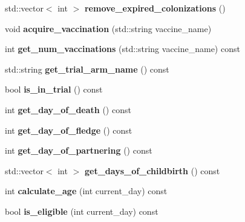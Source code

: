 \begin{DoxyCompactItemize}
\mbox{\label{class_host_a1c83f73e43316586407e721208d5e704}} 
std\+::vector$<$ int $>$ {\bfseries remove\+\_\+expired\+\_\+colonizations} ()
\item 
\mbox{\label{class_host_a69d098ceeaac81c3b6545b8f2ba189b5}} 
void {\bfseries acquire\+\_\+vaccination} (std\+::string vaccine\+\_\+name)
\item 
\mbox{\label{class_host_a2b04ced718b86ae04af2097fbf369360}} 
int {\bfseries get\+\_\+num\+\_\+vaccinations} (std\+::string vaccine\+\_\+name) const
\item 
\mbox{\label{class_host_aa2db492a08b642254b80ecc590b15dc3}} 
std\+::string {\bfseries get\+\_\+trial\+\_\+arm\+\_\+name} () const
\item 
\mbox{\label{class_host_aad27a8ad2d8129fb19830cb2efc03a3d}} 
bool {\bfseries is\+\_\+in\+\_\+trial} () const
\item 
\mbox{\label{class_host_ab655243bf3c03ce6ce912f3f29034548}} 
int {\bfseries get\+\_\+day\+\_\+of\+\_\+death} () const
\item 
\mbox{\label{class_host_a050edec928d29fd287450fb20c95903a}} 
int {\bfseries get\+\_\+day\+\_\+of\+\_\+fledge} () const
\item 
\mbox{\label{class_host_ac35646a80288c11250f0e82789a84744}} 
int {\bfseries get\+\_\+day\+\_\+of\+\_\+partnering} () const
\item 
\mbox{\label{class_host_a3bc024680b5c0e69c4b2577f3dcac543}} 
std\+::vector$<$ int $>$ {\bfseries get\+\_\+days\+\_\+of\+\_\+childbirth} () const
\item 
\mbox{\label{class_host_a28f0b58ee731c24b20c09b88d286a0e7}} 
int {\bfseries calculate\+\_\+age} (int current\+\_\+day) const
\item 
\mbox{\label{class_host_a7b881817c8d2f8d278455a4ebe26d674}} 
bool {\bfseries is\+\_\+eligible} (int current\+\_\+day) const
\item 
\mbox{\label{class_host_a691d74bc50e3b7ea1dfba37413de7d29}} 

\end{DoxyCompactItemize}
